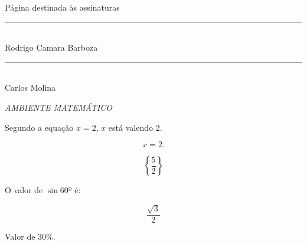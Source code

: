 \documentclass[12pt, a4paper]{article}
\begin{document}
\newpage

\hrulefill
\begin{center}
\Large{Página destinada às assinaturas}
\end{center}

\hrulefill

\vspace{2cm}

\begin{center}
\rule{10cm}{0.02cm}\\
Rodrigo Camara Barboza
\end{center}

\vspace{1cm}

\begin{center}
\rule{10cm}{0.02cm}\\
Carlos Molina
\end{center}
\newpage

\hrulefill

\begin{center}
\Large{\textit{AMBIENTE MATEMÁTICO}}
\end{center}

\hrulefill

\vspace{0.5cm}

Segundo a equação $ x = 2 $, $x$ está valendo 2.

\begin{equation}
x = 2.
\end{equation}

\begin{equation}
\left\lbrace \frac{5}{2} \right\rbrace
\end{equation}

O valor de $\sin 60º$ é:

\begin{equation}
\frac{\sqrt{3}}{2}
\end{equation}

Valor de 30$\%$.
\end{document}
